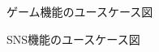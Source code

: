 \documentclass[a4j]{jarticle}
\begin{document}
\begin{figure}[H]
  \begin{center}
    \caption{ゲーム機能のユースケース図}
    \label{ゲーム}
  \end{center}
\end{figure}

\begin{figure}[H]
  \begin{center}
    \caption{SNS機能のユースケース図}
    \label{SNS}
  \end{center}
\end{figure}
\end{document}
